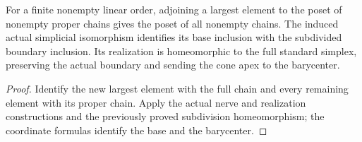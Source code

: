 \begin{proposition}
  \label{prop:actual-order-boundary-cone}
  \leanok
  For a finite nonempty linear order, adjoining a largest element to the poset of nonempty proper chains gives the poset of all nonempty chains. The induced actual simplicial isomorphism identifies its base inclusion with the subdivided boundary inclusion. Its realization is homeomorphic to the full standard simplex, preserving the actual boundary and sending the cone apex to the barycenter.
\end{proposition}
\begin{proof}
  Identify the new largest element with the full chain and every remaining element with its proper chain. Apply the actual nerve and realization constructions and the previously proved subdivision homeomorphism; the coordinate formulas identify the base and the barycenter.
  \leanok
\end{proof}

